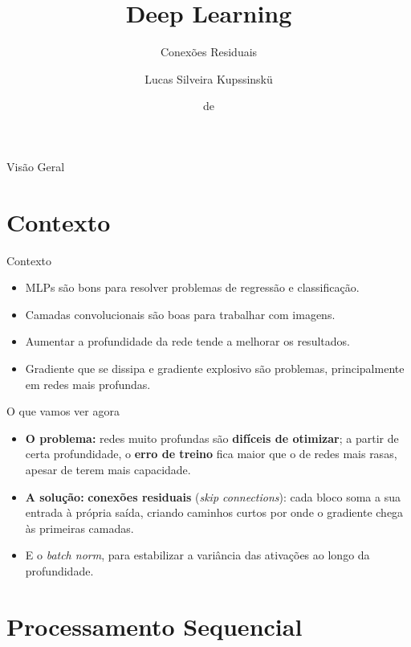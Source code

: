 \documentclass[aspectratio=169,xcolor=dvipsnames]{beamer}
\title{Deep Learning}
\subtitle{Conexões Residuais}
\author{Lucas Silveira Kupssinskü}
\institute
{
    Machine Learning Theory and Applications Laboratory \\
    PUCRS
}
\date{\mespor de \the\year}
\begin{document}
\begin{frame}
    \titlepage
\end{frame}

\begin{frame}{Visão Geral}
    \tableofcontents
\end{frame}

\section{Contexto}

\begin{frame}{Contexto}
\begin{itemize}
    \item MLPs são bons para resolver problemas de regressão e classificação.
    \item Camadas convolucionais são boas para trabalhar com imagens.
    \item Aumentar a profundidade da rede tende a melhorar os resultados.
    \item Gradiente que se dissipa e gradiente explosivo são problemas, principalmente em redes mais profundas.
\end{itemize}
\end{frame}

\begin{frame}{O que vamos ver agora}
\begin{itemize}
    \item \textbf{O problema:} redes muito profundas são \textbf{difíceis de otimizar}; a partir de certa profundidade, o \textbf{erro de treino} fica maior que o de redes mais rasas, apesar de terem mais capacidade.
    \item \textbf{A solução:} \textbf{conexões residuais} (\textit{skip connections}): cada bloco soma a sua entrada à própria saída, criando caminhos curtos por onde o gradiente chega às primeiras camadas.
    \item E o \textit{batch norm}, para estabilizar a variância das ativações ao longo da profundidade.
\end{itemize}
\end{frame}

\section{Processamento Sequencial}
\end{document}
